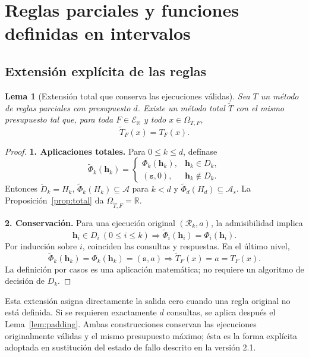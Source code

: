 \documentclass[11pt,a4paper]{article}
\numberwithin{equation}{section}
\newtheorem{lemma}[theorem]{Lema}
\theoremstyle{definition}
\theoremstyle{remark}
\newcommand{\R}{\mathbb R}
\newcommand{\ER}{\mathcal E_{\R}}
\newcommand{\Rec}{\mathcal R}
\newcommand{\hc}{\mathbf h}
\newcommand{\st}{\mathtt s}
\newcommand{\paso}[1]{\par\smallskip\noindent\textbf{#1}\quad}
\begin{document}
\clearpage
\section{Reglas parciales y funciones definidas en intervalos}\label{sec:partial}

\subsection{Extensión explícita de las reglas}
\begin{lemma}[Extensión total que conserva las ejecuciones válidas]\label{lem:extension}
Sea $T$ un método de reglas parciales con presupuesto $d$. Existe un método total $\widetilde T$ con el mismo presupuesto tal que, para toda $F\in\ER$ y todo $x\in\Omega_{T,F}$,
\[
\widetilde T_F(x)=T_F(x).
\]
\end{lemma}
\begin{proof}
\paso{1. Aplicaciones totales.}
Para $0\le k\le d$, defínase
\[
\widetilde\Phi_k(\hc_k)=
\begin{cases}\Phi_k(\hc_k),&\hc_k\in D_k,\\(\st,0),&\hc_k\notin D_k.
\end{cases}
\]
Entonces $\widetilde D_k=H_k$, $\widetilde\Phi_k(H_k)\subseteq\mathcal A$ para $k<d$ y $\widetilde\Phi_d(H_d)\subseteq\mathcal A_s$. La Proposición~\ref{prop:total} da $\Omega_{\widetilde T,F}=\R$.
\paso{2. Conservación.}
Para una ejecución original $(\Rec_k,a)$, la admisibilidad implica
\[
\hc_i\in D_i\ (0\le i\le k)
\Longrightarrow\widetilde\Phi_i(\hc_i)=\Phi_i(\hc_i).
\]
Por inducción sobre $i$, coinciden las consultas y respuestas. En el último nivel,
\[
\widetilde\Phi_k(\hc_k)=\Phi_k(\hc_k)=(\st,a)
\Longrightarrow\widetilde T_F(x)=a=T_F(x).
\]
La definición por casos es una aplicación matemática; no requiere un algoritmo de decisión de $D_k$.
\end{proof}

Esta extensión asigna directamente la salida cero cuando una regla original no está definida. Si se requieren exactamente $d$ consultas, se aplica después el Lema~\ref{lem:padding}. Ambas construcciones conservan las ejecuciones originalmente válidas y el mismo presupuesto máximo; ésta es la forma explícita adoptada en sustitución del estado de fallo descrito en la versión 2.1.
\end{document}
